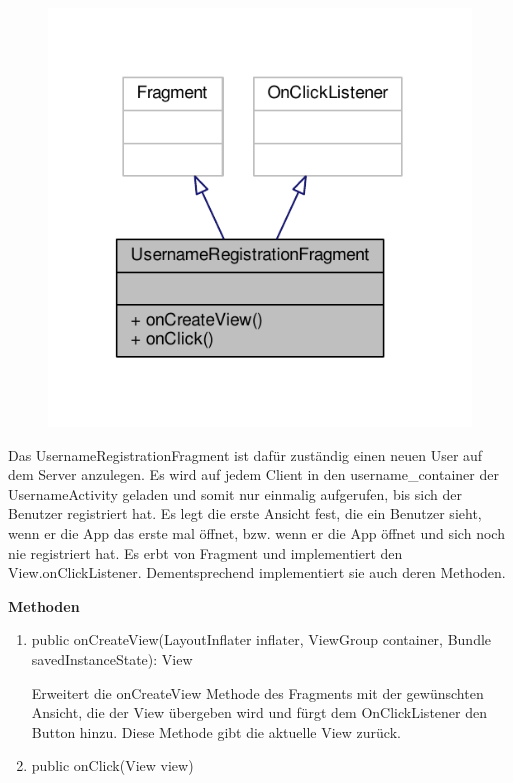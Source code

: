 \begin{enumerate}
	\begin{figure}[H]
		\includegraphics[scale = 1]{res/username_registration_fragment__inherit__graph.pdf}
		\centering
	\end{figure}
	Das UsernameRegistrationFragment ist dafür zuständig einen neuen User auf dem Server anzulegen. Es wird auf jedem Client in den username\_container der UsernameActivity geladen und somit nur einmalig aufgerufen, bis sich der Benutzer registriert hat. Es legt die erste Ansicht fest, die ein Benutzer sieht, wenn er die App das erste mal öffnet, bzw. wenn er die App öffnet und sich noch nie registriert hat. Es erbt von Fragment und implementiert den View.onClickListener. Dementsprechend implementiert sie auch deren Methoden.
	
	\textbf{Methoden}
	
	\begin{enumerate}
		\item public onCreateView(LayoutInflater inflater, ViewGroup container, Bundle savedInstanceState): View

		Erweitert die onCreateView Methode des Fragments mit der gewünschten Ansicht, die der View übergeben wird und fürgt dem OnClickListener den Button hinzu. Diese Methode gibt die aktuelle View zurück.
		
		\item public onClick(View view)


\end{enumerate}
\end{enumerate}
